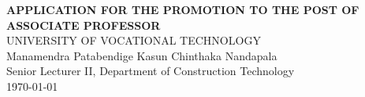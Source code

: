\documentclass[a4paper,11pt]{report}
\begin{document}
\renewcommand{\baselinestretch}{2}

\begin{titlepage}







	\begin{center}
		\vspace*{2cm}

		\Large{
			\textbf{\uppercase{Application for the promotion to the post of Associate Professor }}}\\ \vspace{1cm}
		\large{\uppercase{University of Vocational Technology}}\\ \vspace{3cm}
		\vfill
		\centering
		\large{
			Manamendra Patabendige Kasun Chinthaka Nandapala\\ \vspace{1cm}
			\normalsize{Senior Lecturer II, Department of Construction Technology\\}
		}
		\vspace{2cm}
		\monthyeardate\today





	\end{center}

\end{titlepage}




\renewcommand{\baselinestretch}{1.5}








\doublespacing
\tableofcontents
\label{toc}







\clearpage



\end{document}
